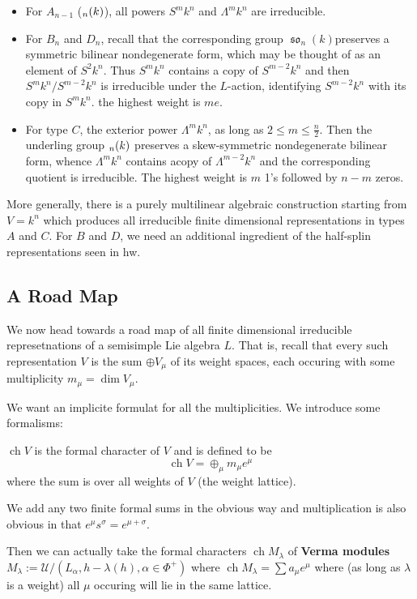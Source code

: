 \documentclass[12pt]{article}
\theoremstyle{nonumberbreak}
\theoremstyle{changebreak}
\theoremstyle{nonumberbreak}
\theoremstyle{change}
\DeclareMathOperator{\ch}{ch}
\let\sl\relax
\DeclareMathOperator{\sl}{\mathfrak{sl}}
\DeclareMathOperator{\so}{\mathfrak{so}}
\let\sp\relax
\DeclareMathOperator{\sp}{\mathfrak{sp}}
\begin{document}
\begin{itemize}
	\item For $A_{n-1}$ ($\sl_n(k)$), all powers $S^mk^n$ and $\Lambda^mk^n$ are irreducible.
	\item For $B_n$ and $D_n$, recall that the corresponding group $\so_n(k)$preserves a symmetric bilinear nondegenerate
	form, which may be thought of as an element of $S^2k^n$. Thus $S^mk^n$ contains a copy of $S^{m-2}k^n$ and then
	$S^mk^n/S^{m-2}k^n$ is irreducible under the $L$-action, identifying $S^{m-2}k^n$ with its copy in $S^mk^n$. the highest weight is $me.$
	\item For type $C$, the exterior power $\Lambda^mk^n$, as long as $2\le m\le\frac{n}{2}$. Then the underling group $\sp_n(k)$ preserves
	a skew-symmetric nondegenerate bilinear form, whence $\Lambda^mk^n$ contains acopy of $\Lambda^{m-2}k^n$ and the corresponding 
	quotient is irreducible. The highest weight is $m$ 1's followed by $n-m$ zeros.
\end{itemize}

More generally, there is a purely multilinear algebraic construction starting from $V=k^n$ which produces all irreducible finite dimensional representations in 
types $A$ and $C$. For $B$ and $D$, we need an additional ingredient of the half-splin representations seen in hw.

\subsection{A Road Map}
We now head towards a road map of all finite dimensional irreducible represetnations of a semisimple Lie algebra $L$. That is, recall 
that every such representation $V$ is the sum $\oplus V_\mu$ of its weight spaces, each occuring with some multiplicity $m_\mu=\dim V_\mu$.

We want an implicite formulat for all the multiplicities. We introduce some formalisms:
\begin{defn}
	$\ch V$ is the formal character of $V$ and is defined to be
	\[\ch V=\oplus_\mu m_\mu e^\mu\]
	where the sum is over all weights of $V$ (the weight lattice).
\end{defn}

We add any two finite formal sums in the obvious way and multiplication is also obvious in that $e^\mu s^\sigma=e^{\mu+\sigma}$.

Then we can actually take the formal characters $\ch M_\lambda$ of \textbf{Verma modules} $M_\lambda :=\mathcal U/(L_\alpha,h-\lambda(h),\alpha\in\Phi^+)$
where $\ch M_\lambda=\sum a_\mu e^\mu$ where (as long as $\lambda$ is a weight) all $\mu$ occuring will lie in the same lattice.
\end{document}
